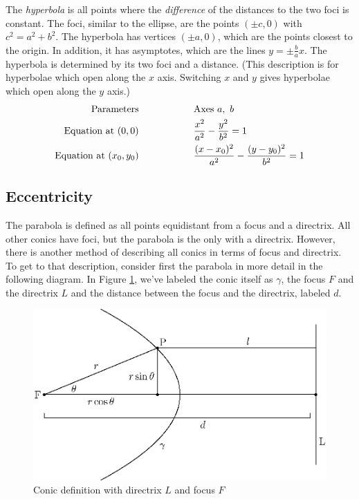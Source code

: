 \documentclass[fleqn,letterpaper]{report}
\begin{document}
\begin{defn}
The \emph{hyperbola} is all points where the \emph{difference}
of the distances to the two foci is constant. The foci,
similar to the ellipse, are the points $(\pm c,0)$ with $c^2 =
a^2 + b^2$. The hyperbola has vertices $(\pm a,0)$, which are
the points closest to the origin.  In addition, it has
asymptotes, which are the lines $y = \pm \frac{b}{a} x$. The
hyperbola is determined by its two foci and a distance. (This
description is for hyperbolae which open along the $x$ axis.
Switching $x$ and $y$ gives hyperbolae which open along the
$y$ axis.)
\begin{align*}
\text{Parameters} \hspace{2cm} & \text{Axes } a, \ b
\vspace{0.3cm} \\
\text{Equation at } (0,0) \hspace{2cm} & \frac{x^2}{a^2} -
\frac{y^2}{b^2} = 1 \vspace{0.3cm} \\
\text{Equation at } (x_0, y_0) \hspace{2cm} &
\frac{(x-x_0)^2}{a^2} - \frac{(y-y_0)^2}{b^2} = 1 \vspace{0.3cm} \\
\end{align*}
\end{defn}

\subsection{Eccentricity}
\label{eccentricity}

The parabola is defined as all points equidistant from a focus
and a directrix. All other conics have foci, but the parabola
is the only with a directrix. However, there is another method
of describing all conics in terms of focus and directrix.  To
get to that description, consider first the parabola in more
detail in the following diagram. In Figure
\ref{figure-focus-directrix}, we've labeled the conic
itself as $\gamma$, the focus $F$ and the directrix $L$ and
the distance between the focus and the directrix, labeled $d$.

\begin{figure}[t]
\centering
\includegraphics[width=12cm]{figure23.eps}
\caption{Conic definition with directrix $L$ and focus $F$}
\label{figure-focus-directrix}
\end{figure} 
\end{document}
